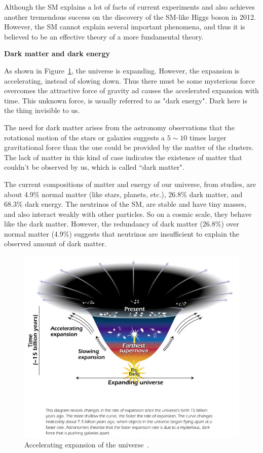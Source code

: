 Although the SM explains a lot of facts of current experiments and also achieves another tremendous success on 
the discovery of the SM-like Higgs boson in 2012. However, the SM cannot explain several
important phenomena, and thus it is believed to be an effective theory of a more fundamental
theory. 

{\bf Dark matter and dark energy}

As shown in Figure~\ref{fig:universe}, the universe is expanding. However, the expansion is accelerating, instead of slowing down. 
Thus there must be some mysterious force overcomes the attractive force of gravity ad  
causes the accelerated expansion with time. 
This unknown force, is usually referred to as "dark energy". Dark here is 
the thing invisible to us. 

The need for dark matter arises from the astronomy observations that the rotational motion of 
the stars or galaxies suggests a $5{\sim}10$ times larger gravitational force than the one could be provided 
by the matter of the clusters. The lack of matter in this kind of case indicates the existence of 
matter that couldn't be observed by us, which is called ``dark matter".   
 
The current compositions of matter and energy of our universe, from studies, are about 4.9\% normal matter (like stars, planets, etc.), 26.8\% dark matter, and 68.3\% dark energy. The neutrinos of the SM, are stable and have tiny masses, and also interact weakly with other particles. So on a cosmic scale, they behave like 
the dark matter. However, the redundancy of dark matter (26.8\%) over normal matter (4.9\%) suggests that neutrinos are insufficient to explain the observed amount of dark matter. 

\begin{figure}[htbp]
\centering
\includegraphics[width=.7\textwidth]{figures/accelerating_universe.jpg}
\caption{Accelerating expansion of the universe~\cite{web:nasa}.}
\label{fig:universe}
\end{figure}  



